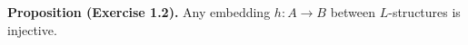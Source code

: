 \textbf{Proposition (Exercise 1.2).}
Any embedding $h : A \rightarrow B$ between $L$-structures is injective.
